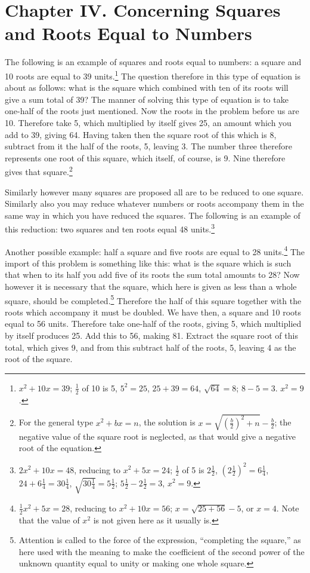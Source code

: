 \documentclass[11pt,a4paper]{book}
\begin{document}
\section*{Chapter IV. Concerning Squares and Roots Equal to Numbers}

The following is an example of squares and roots equal to numbers: a square and 10 roots are equal to 39 units.\footnote{$x^2 + 10x = 39$; $\frac{1}{2}$ of 10 is 5, $5^2 = 25$, $25 + 39 = 64$, $\sqrt{64} = 8$; $8 - 5 = 3$. $x^2 = 9$.} The question therefore in this type of equation is about as follows: what is the square which combined with ten of its roots will give a sum total of 39? The manner of solving this type of equation is to take one-half of the roots just mentioned. Now the roots in the problem before us are 10. Therefore take 5, which multiplied by itself gives 25, an amount which you add to 39, giving 64. Having taken then the square root of this which is 8, subtract from it the half of the roots, 5, leaving 3. The number three therefore represents one root of this square, which itself, of course, is 9. Nine therefore gives that square.\footnote{For the general type $x^2 + bx = n$, the solution is $x = \sqrt{(\frac{b}{2})^2 + n} - \frac{b}{2}$; the negative value of the square root is neglected, as that would give a negative root of the equation.}

Similarly however many squares are proposed all are to be reduced to one square. Similarly also you may reduce whatever numbers or roots accompany them in the same way in which you have reduced the squares. The following is an example of this reduction: two squares and ten roots equal 48 units.\footnote{$2x^2 + 10x = 48$, reducing to $x^2 + 5x = 24$; $\frac{1}{2}$ of 5 is $2\frac{1}{2}$, $(2\frac{1}{2})^2 = 6\frac{1}{4}$, $24 + 6\frac{1}{4} = 30\frac{1}{4}$, $\sqrt{30\frac{1}{4}} = 5\frac{1}{2}$; $5\frac{1}{2} - 2\frac{1}{2} = 3$, $x^2 = 9$.}

Another possible example: half a square and five roots are equal to 28 units.\footnote{$\frac{1}{2}x^2 + 5x = 28$, reducing to $x^2 + 10x = 56$; $x = \sqrt{25 + 56} - 5$, or $x = 4$. Note that the value of $x^2$ is not given here as it usually is.} The import of this problem is something like this: what is the square which is such that when to its half you add five of its roots the sum total amounts to 28? Now however it is necessary that the square, which here is given as less than a whole square, should be completed.\footnote{Attention is called to the force of the expression, ``completing the square,'' as here used with the meaning to make the coefficient of the second power of the unknown quantity equal to unity or making one whole square.} Therefore the half of this square together with the roots which accompany it must be doubled. We have then, a square and 10 roots equal to 56 units. Therefore take one-half of the roots, giving 5, which multiplied by itself produces 25. Add this to 56, making 81. Extract the square root of this total, which gives 9, and from this subtract half of the roots, 5, leaving 4 as the root of the square.
\end{document}
